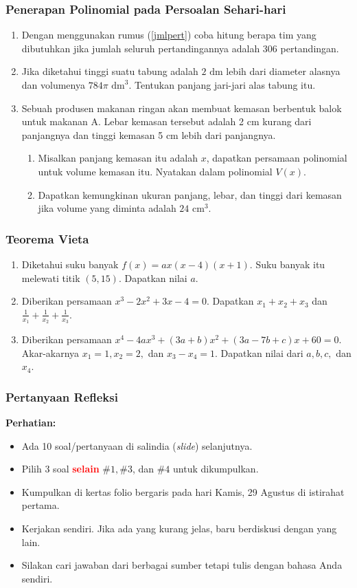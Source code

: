 \documentclass[11pt]{beamer}
\begin{document}
	\begin{frame}
		\frametitle{Penerapan Polinomial pada Persoalan Sehari-hari}
		\begin{enumerate}
			\item Dengan menggunakan rumus (\ref{jmlpert}) coba hitung berapa tim yang dibutuhkan jika jumlah seluruh pertandingannya adalah 306 pertandingan.
			\item Jika diketahui tinggi suatu tabung adalah $2 \text{ dm}$ lebih dari diameter alasnya dan volumenya $784\pi \text{ dm}^3$. Tentukan panjang jari-jari alas tabung itu.
			\item Sebuah produsen makanan ringan akan membuat kemasan berbentuk balok untuk makanan A. Lebar kemasan tersebut adalah 2 cm kurang dari panjangnya dan tinggi kemasan 5 cm lebih dari panjangnya. 
			
			\begin{enumerate}
				\item Misalkan panjang kemasan itu adalah $x$, dapatkan persamaan polinomial untuk volume kemasan itu. Nyatakan dalam polinomial $V(x).$
				\item Dapatkan kemungkinan ukuran panjang, lebar, dan tinggi dari kemasan jika volume yang diminta adalah $24 \text{ cm}^3$. 
			\end{enumerate}
		\end{enumerate}
		
	\end{frame}
	
	\begin{frame}
		\frametitle{Teorema Vieta}
		\begin{enumerate}
			\item Diketahui suku banyak $f(x)=ax(x-4)(x+1).$ Suku banyak itu melewati titik $(5,15)$. Dapatkan nilai $a$.
			\item Diberikan persamaan $x^3-2x^2+3x-4=0$. Dapatkan $x_1+x_2+x_3$ dan $\frac{1}{x_1}+\frac{1}{x_2}+\frac{1}{x_3}$.
			\item Diberikan persamaan $x^4-4ax^3+(3a+b)x^2+(3a-7b+c)x+60=0$. Akar-akarnya $x_1=1, x_2=2,$ dan $x_3-x_4=1$. Dapatkan nilai dari $a, b, c,$ dan $x_4$. 
		\end{enumerate}
		
	\end{frame}
	
	\begin{frame}
		\frametitle{Pertanyaan Refleksi}
		\textbf{Perhatian:}
		\begin{itemize}
			\item Ada 10 soal/pertanyaan di salindia (\textit{slide}) selanjutnya.
			\item Pilih 3 soal \textbf{\textcolor{red}{selain}} $\#1,\#3$, dan $\#4$ untuk dikumpulkan.
			\item Kumpulkan di kertas folio bergaris pada hari Kamis, 29 Agustus di istirahat pertama.
			\item Kerjakan sendiri. Jika ada yang kurang jelas, baru berdiskusi dengan yang lain.
			\item Silakan cari jawaban dari berbagai sumber tetapi tulis dengan bahasa Anda sendiri.
		\end{itemize}
		 		
	\end{frame}
	
\end{document}
